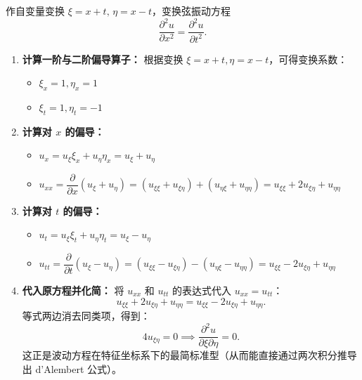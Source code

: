 \documentclass[lang=cn,11pt]{elegantbook}
\begin{document}
\begin{exercise}[特征线变换下的波动方程]
作自变量变换 $\xi=x+t,\,\eta=x-t$，变换弦振动方程
\[
\frac{\partial^2 u}{\partial x^2} = \frac{\partial^2 u}{\partial t^2}.
\]
\end{exercise}

\begin{solution}
\begin{enumerate}
  \item \textbf{计算一阶与二阶偏导算子：}
  根据变换 $\xi=x+t, \eta=x-t$，可得变换系数：
  \begin{itemize}
      \item $\xi_x = 1, \eta_x = 1$
      \item $\xi_t = 1, \eta_t = -1$
  \end{itemize}
  
  \item \textbf{计算对 $x$ 的偏导：}
  \begin{itemize}
      \item $u_x = u_\xi \xi_x + u_\eta \eta_x = u_\xi + u_\eta$
      \item $u_{xx} = \dfrac{\partial}{\partial x}(u_\xi + u_\eta) = (u_{\xi\xi} + u_{\xi\eta}) + (u_{\eta\xi} + u_{\eta\eta}) = u_{\xi\xi} + 2u_{\xi\eta} + u_{\eta\eta}$
  \end{itemize}
  
  \item \textbf{计算对 $t$ 的偏导：}
  \begin{itemize}
      \item $u_t = u_\xi \xi_t + u_\eta \eta_t = u_\xi - u_\eta$
      \item $u_{tt} = \dfrac{\partial}{\partial t}(u_\xi - u_\eta) = (u_{\xi\xi} - u_{\xi\eta}) - (u_{\eta\xi} - u_{\eta\eta}) = u_{\xi\xi} - 2u_{\xi\eta} + u_{\eta\eta}$
  \end{itemize}
  
  \item \textbf{代入原方程并化简：}
  将 $u_{xx}$ 和 $u_{tt}$ 的表达式代入 $u_{xx} = u_{tt}$：
  \[
  u_{\xi\xi} + 2u_{\xi\eta} + u_{\eta\eta} = u_{\xi\xi} - 2u_{\xi\eta} + u_{\eta\eta}.
  \]
  等式两边消去同类项，得到：
  \[
  4u_{\xi\eta} = 0 \implies \frac{\partial^2 u}{\partial \xi \partial \eta} = 0.
  \]
  这正是波动方程在特征坐标系下的最简标准型（从而能直接通过两次积分推导出 d'Alembert 公式）。
\end{enumerate}
\end{solution}




\end{document}
